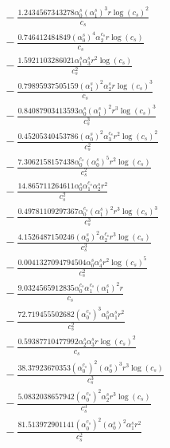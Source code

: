 \documentclass[10pt]{article}
\begin{document}
\begin{align*}
&{}  - \frac{1.2434567343278 \alpha_{0}^s \left(\alpha_{1}^s\right)^{3} r \log{\left(c_{s} \right)}^{2}}{c_{s}} \\
&{}  - \frac{0.746412484849 \left(\alpha_{0}^s\right)^{4} \alpha_{2}^{c_s} r \log{\left(c_{s} \right)}}{c_{s}} \\
&{}  - \frac{1.5921103286021 \alpha_{1}^s \alpha_{3}^s r^{2} \log{\left(c_{s} \right)}}{c_{s}^{2}} \\
&{}  - \frac{0.79895937505159 \left(\alpha_{1}^s\right)^{2} \alpha_{2}^s r \log{\left(c_{s} \right)}^{3}}{c_{s}} \\
&{}  - \frac{0.84087903413593 \alpha_{0}^s \left(\alpha_{1}^s\right)^{2} r^{3} \log{\left(c_{s} \right)}^{3}}{c_{s}^{3}} \\
&{}  - \frac{0.45205340453786 \left(\alpha_{0}^s\right)^{2} \alpha_{3}^{c_s} r^{2} \log{\left(c_{s} \right)}^{2}}{c_{s}^{2}} \\
&{}  - \frac{7.3062158157438 \alpha_{0}^{c_s} \left(\alpha_{0}^s\right)^{5} r^{2} \log{\left(c_{s} \right)}}{c_{s}^{2}} \\
&{}  - \frac{14.865711264611 \alpha_{0}^s \alpha_{1}^{c_s} \alpha_{2}^s r^{2}}{c_{s}^{2}} \\
&{}  - \frac{0.49781109297367 \alpha_{0}^{c_s} \left(\alpha_{1}^s\right)^{2} r^{3} \log{\left(c_{s} \right)}^{3}}{c_{s}^{3}} \\
&{}  - \frac{4.1526487150246 \left(\alpha_{0}^s\right)^{2} \alpha_{2}^{c_s} r^{3} \log{\left(c_{s} \right)}}{c_{s}^{3}} \\
&{}  - \frac{0.0041327094794504 \alpha_{0}^s \alpha_{4}^s r^{2} \log{\left(c_{s} \right)}^{5}}{c_{s}^{2}} \\
&{}  - \frac{9.0324565912835 \alpha_{0}^{c_s} \alpha_{1}^{c_s} \left(\alpha_{1}^s\right)^{2} r}{c_{s}} \\
&{}  - \frac{72.719455502682 \left(\alpha_{0}^{c_s}\right)^{3} \alpha_{0}^s \alpha_{1}^s r^{2}}{c_{s}^{2}} \\
&{}  - \frac{0.59387710477992 \alpha_{2}^s \alpha_{3}^s r \log{\left(c_{s} \right)}^{2}}{c_{s}} \\
&{}  - \frac{38.37923670353 \left(\alpha_{0}^{c_s}\right)^{2} \left(\alpha_{0}^s\right)^{3} r^{3} \log{\left(c_{s} \right)}}{c_{s}^{3}} \\
&{}  - \frac{5.0832038657942 \left(\alpha_{0}^{c_s}\right)^{2} \alpha_{2}^s r^{3} \log{\left(c_{s} \right)}}{c_{s}^{3}} \\
&{}  - \frac{81.513972901141 \left(\alpha_{0}^{c_s}\right)^{2} \left(\alpha_{0}^s\right)^{2} \alpha_{1}^s r^{2}}{c_{s}^{2}} \\

\end{align*}
\end{document}
